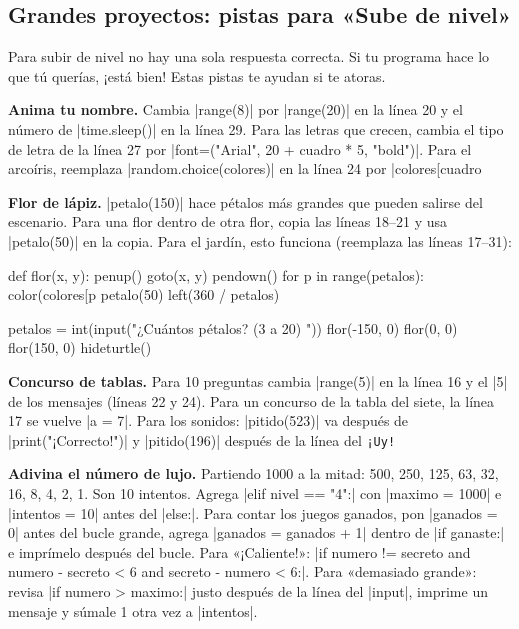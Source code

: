 
\subsection*{Grandes proyectos: pistas para «Sube de nivel»}
Para subir de nivel no hay una sola respuesta correcta. Si tu programa hace lo que tú querías, ¡está bien! Estas pistas te ayudan si te atoras.

\textbf{Anima tu nombre.} Cambia \py|range(8)| por \py|range(20)| en la línea 20 y el número de \py|time.sleep()| en la línea 29. Para las letras que crecen, cambia el tipo de letra de la línea 27 por \py|font=("Arial", 20 + cuadro * 5, "bold")|. Para el arcoíris, reemplaza \py|random.choice(colores)| en la línea 24 por \py|colores[cuadro %

\textbf{Flor de lápiz.} \py|petalo(150)| hace pétalos más grandes que pueden salirse del escenario. Para una flor dentro de otra flor, copia las líneas 18--21 y usa \py|petalo(50)| en la copia. Para el jardín, esto funciona (reemplaza las líneas 17--31):
\begin{codenonum}
def flor(x, y):
    penup()
    goto(x, y)
    pendown()
    for p in range(petalos):
        color(colores[p %
        petalo(50)
        left(360 / petalos)

petalos = int(input("¿Cuántos pétalos? (3 a 20) "))
flor(-150, 0)
flor(0, 0)
flor(150, 0)
hideturtle()
\end{codenonum}

\textbf{Concurso de tablas.} Para 10 preguntas cambia \py|range(5)| en la línea 16 y el \py|5| de los mensajes (líneas 22 y 24). Para un concurso de la tabla del siete, la línea 17 se vuelve \py|a = 7|. Para los sonidos: \py|pitido(523)| va después de \py|print("¡Correcto!")| y \py|pitido(196)| después de la línea del \texttt{¡Uy!}

\textbf{Adivina el número de lujo.} Partiendo 1000 a la mitad: 500, 250, 125, 63, 32, 16, 8, 4, 2, 1. Son 10 intentos. Agrega \py|elif nivel == "4":| con \py|maximo = 1000| e \py|intentos = 10| antes del \py|else:|. Para contar los juegos ganados, pon \py|ganados = 0| antes del bucle grande, agrega \py|ganados = ganados + 1| dentro de \py|if ganaste:| e imprímelo después del bucle. Para «¡Caliente!»: \py|if numero != secreto and numero - secreto < 6 and secreto - numero < 6:|. Para «demasiado grande»: revisa \py|if numero > maximo:| justo después de la línea del \py|input|, imprime un mensaje y súmale 1 otra vez a \py|intentos|.

